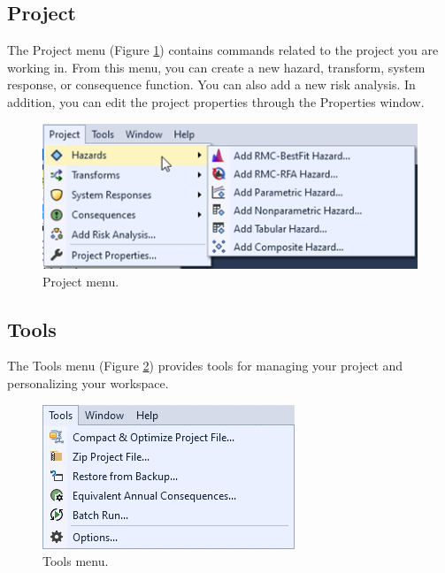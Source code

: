 \documentclass[
]{book}
\begin{document}
\hypertarget{gui-menu-bar-project}{%
\subsection{Project}\label{gui-menu-bar-project}}

The Project menu (Figure \ref{fig:figure-9}) contains commands related to the project you are working in. From this menu, you can create a new hazard, transform, system response, or consequence function. You can also add a new risk analysis. In addition, you can edit the project properties through the Properties window.

\begin{figure}

{\centering \includegraphics{images/figure9} 

}

\caption{Project menu.}\label{fig:figure-9}
\end{figure}

\hypertarget{gui-menu-bar-tools}{%
\subsection{Tools}\label{gui-menu-bar-tools}}

The Tools menu (Figure \ref{fig:figure-10}) provides tools for managing your project and personalizing your workspace.

\begin{figure}

{\centering \includegraphics{images/figure10} 

}

\caption{Tools menu.}\label{fig:figure-10}
\end{figure}
\end{document}
